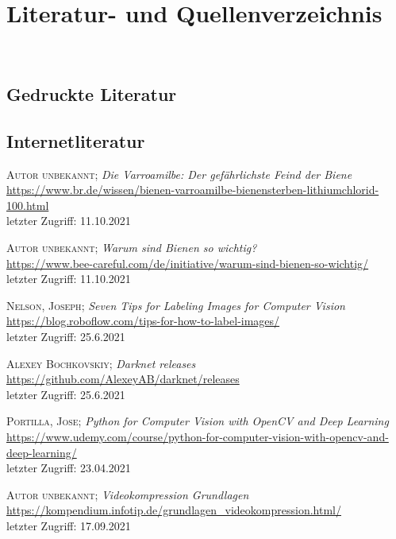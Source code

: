 \documentclass[11pt,a4paper]{article}
\newcommand{\bibLabel}[1]{\label{#1}\hypertarget{#1}{}}
\begin{document}
\section{Literatur- und Quellenverzeichnis}
\begin{thebibliography}
\\
\subsection{Gedruckte Literatur}

\subsection{Internetliteratur}
\setcounter{enumiv}{0}

\label{i1}
	\textsc{Autor unbekannt};
	\textit{Die Varroamilbe: Der gefährlichste Feind der Biene}\\
	\url{https://www.br.de/wissen/bienen-varroamilbe-bienensterben-lithiumchlorid-100.html}\\
	letzter Zugriff: 11.10.2021

\label{i2}
	\textsc{Autor unbekannt};
	\textit{Warum sind Bienen so wichtig?}\\
	\url{https://www.bee-careful.com/de/initiative/warum-sind-bienen-so-wichtig/}\\
	letzter Zugriff: 11.10.2021

 \bibLabel{annotate-tips}
	\textsc{Nelson, Joseph};
	\textit{Seven Tips for Labeling Images for Computer Vision}\\
	\url{https://blog.roboflow.com/tips-for-how-to-label-images/}\\
	letzter Zugriff: 25.6.2021

 \bibLabel{darknet-yolov4}
	\textsc{Alexey Bochkovskiy};
	\textit{Darknet releases}\\
	\url{https://github.com/AlexeyAB/darknet/releases}\\
	letzter Zugriff: 25.6.2021

 \bibLabel{udemy}
	\textsc{Portilla, Jose};
	\textit{Python for Computer Vision with OpenCV and Deep Learning}\\
	\url{https://www.udemy.com/course/python-for-computer-vision-with-opencv-and-deep-learning/}\\
	letzter Zugriff: 23.04.2021

 \bibLabel{compression}
	\textsc{Autor unbekannt};
	\textit{Videokompression Grundlagen}\\
	\url{https://kompendium.infotip.de/grundlagen_videokompression.html/}\\
	letzter Zugriff: 17.09.2021

\end{thebibliography}
\end{document}
